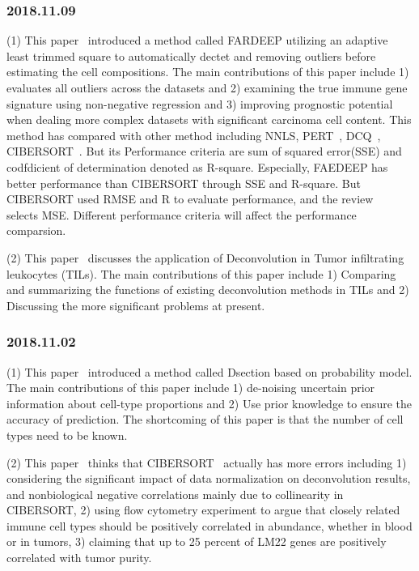\documentclass{article}
\begin{document}
\subsubsection{2018.11.09}
(1) This paper~\cite{Hao358366} introduced a method called FARDEEP utilizing an adaptive least trimmed square to automatically dectet and removing outliers before estimating the cell compositions. The main contributions of this paper include 1) evaluates all outliers across the datasets and 2) examining the true immune gene signature using non-negative regression and 3) improving prognostic potential when dealing more complex datasets with significant carcinoma cell content. This method has compared with other method including NNLS, PERT~\cite{Qiao2012PERT}, DCQ~\cite{Altboum2014Digital}, CIBERSORT~\cite{Newman2015Robust}. But its Performance criteria are sum of squared error(SSE) and codfdicient of determination denoted as R-square. Especially, FAEDEEP has better performance than CIBERSORT through SSE and R-square. But CIBERSORT used RMSE and R to evaluate performance, and the review~\cite{Mohammadi2017A} selects MSE. Different performance criteria will affect the performance comparsion.

(2) This paper~\cite{Newman2016High} discusses the application of Deconvolution in Tumor infiltrating leukocytes (TILs). The main contributions of this paper include 1) Comparing and summarizing the functions of existing deconvolution methods in TILs and 2) Discussing the more significant problems at present.

\subsubsection{2018.11.02}
(1) This paper~\cite{Lehmusvaara2010Probabilistic} introduced a method called Dsection based on probability model. The main contributions of this paper include 1) de-noising uncertain prior information about cell-type proportions and 2) Use prior knowledge to ensure the accuracy of prediction. The shortcoming of this paper is that the number of cell types need to be known.

(2) This paper~\cite{Li2017Revisit} thinks that CIBERSORT~\cite{Newman2015Robust} actually has more errors including 1) considering the significant impact of data normalization on deconvolution results, and nonbiological negative correlations mainly due to collinearity in CIBERSORT, 2) using flow cytometry experiment to argue that closely related immune cell types should be positively correlated in abundance, whether in blood or in tumors, 3) claiming that up to 25 percent of LM22 genes are positively correlated with tumor purity.   
\end{document}
